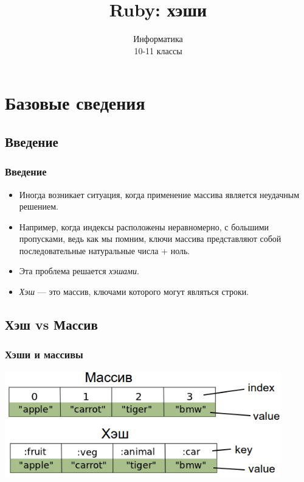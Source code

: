 \documentclass[compress,red]{beamer}
\title{Ruby: хэши}
\author{Информатика \\ 10-11 классы}
\begin{document}
\maketitle

\section{Базовые сведения}

\subsection{Введение}
\begin{frame}
  \frametitle{Введение}
  \begin{itemize}
    \item Иногда возникает ситуация, когда применение массива является неудачным решением.
    \item Например, когда индексы расположены неравномерно, с большими пропусками, ведь как мы помним, ключи массива представляют собой последовательные натуральные числа + ноль.
    \item Эта проблема решается \emph{хэшами}.
    \item \emph{Хэш} --- это массив, ключами которого могут являться строки.
  \end{itemize}
\end{frame}

\subsection{Хэш vs Массив}
\begin{frame}
  \frametitle{Хэши и массивы}
	\centerline{\includegraphics[width=0.9\textwidth]{images/hash_vs_array.png}}
\end{frame}
\end{document}
